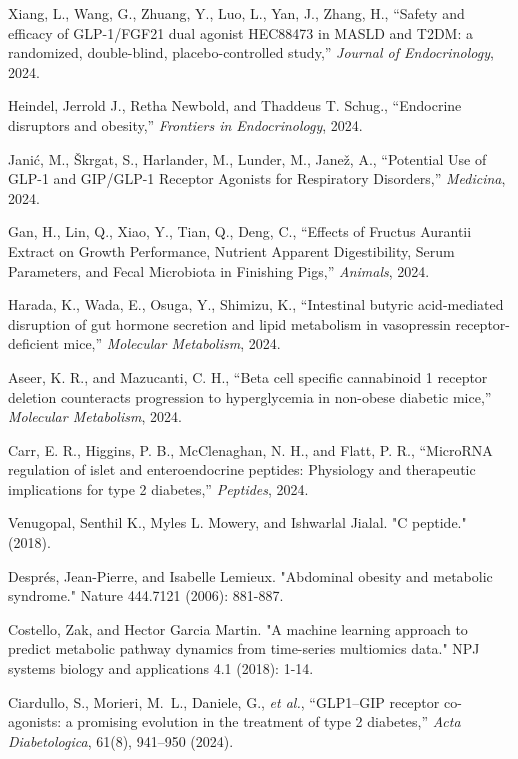 \documentclass[9pt,shortpaper,twoside,web]{ieeecolor}
\begin{document}
\begin{thebibliography}{00}
Xiang, L., Wang, G., Zhuang, Y., Luo, L., Yan, J., Zhang, H., ``Safety and efficacy of GLP-1/FGF21 dual agonist HEC88473 in MASLD and T2DM: a randomized, double-blind, placebo-controlled study,'' \textit{Journal of Endocrinology}, 2024. 

Heindel, Jerrold J., Retha Newbold, and Thaddeus T. Schug., ``Endocrine disruptors and obesity,'' \textit{Frontiers in Endocrinology}, 2024. 

Janić, M., Škrgat, S., Harlander, M., Lunder, M., Janež, A., ``Potential Use of GLP-1 and GIP/GLP-1 Receptor Agonists for Respiratory Disorders,'' \textit{Medicina}, 2024.

Gan, H., Lin, Q., Xiao, Y., Tian, Q., Deng, C., ``Effects of Fructus Aurantii Extract on Growth Performance, Nutrient Apparent Digestibility, Serum Parameters, and Fecal Microbiota in Finishing Pigs,'' \textit{Animals}, 2024. 

Harada, K., Wada, E., Osuga, Y., Shimizu, K., ``Intestinal butyric acid-mediated disruption of gut hormone secretion and lipid metabolism in vasopressin receptor-deficient mice,'' \textit{Molecular Metabolism}, 2024. 

Aseer, K. R., and Mazucanti, C. H., ``Beta cell specific cannabinoid 1 receptor deletion counteracts progression to hyperglycemia in non-obese diabetic mice,'' \textit{Molecular Metabolism}, 2024.

Carr, E. R., Higgins, P. B., McClenaghan, N. H., and Flatt, P. R., ``MicroRNA regulation of islet and enteroendocrine peptides: Physiology and therapeutic implications for type 2 diabetes,'' \textit{Peptides}, 2024.

Venugopal, Senthil K., Myles L. Mowery, and Ishwarlal Jialal. "C peptide." (2018).

Després, Jean-Pierre, and Isabelle Lemieux. "Abdominal obesity and metabolic syndrome." Nature 444.7121 (2006): 881-887.


Costello, Zak, and Hector Garcia Martin. "A machine learning approach to predict metabolic pathway dynamics from time-series multiomics data." NPJ systems biology and applications 4.1 (2018): 1-14.

Ciardullo, S., Morieri, M.~L., Daniele, G., \textit{et al.},
``GLP1–GIP receptor co-agonists: a promising evolution in the treatment of type 2 diabetes,''
\textit{Acta Diabetologica}, 61(8), 941–950 (2024).


\end{thebibliography}
\end{document}
